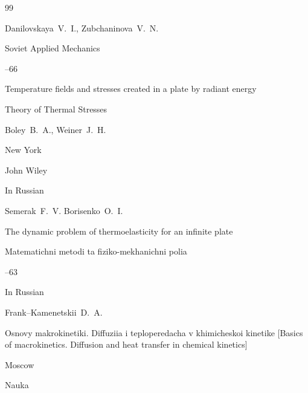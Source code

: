 \begin{thebibliography}{99}

\by Danilovskaya~V.~I., Zubchaninova~V.~N.

\jour Soviet Applied Mechanics 




–66 

\paper Temperature fields and stresses created in a plate by radiant energy







\book Theory of Thermal Stresses

\by Boley~B.~A., Weiner~J.~H. 

\publaddr New York 

\publ John Wiley






\lang In Russian

\by Semerak~F.~V. Borisenko~O.~I.

\paper The dynamic problem of thermoelasticity for an infinite plate

\jour  Matematichni metodi ta fiziko-mekhanichni polia



--63






\lang In Russian

\by Frank--Kamenetskii~D.~A.

\book  Osnovy makrokinetiki. Diffuziia i teploperedacha v khimicheskoi kinetike \rm [Basics of macrokinetics. Diffusion and heat transfer in chemical kinetics]

\publaddr Moscow

\publ  Nauka











\end{thebibliography}
